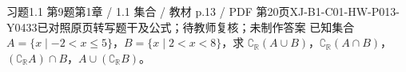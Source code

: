 \par\noindent\begin{minipage}{\linewidth}
\begin{bankitem}{习题1.1 第9题}{第1章 / 1.1 集合 / 教材 p.13 / PDF 第20页}{XJ-B1-C01-HW-P013-Y0433}{已对照原页转写题干及公式；待教师复核；未制作答案}
已知集合 $A=\{x\mid-2<x\le5\}$，$B=\{x\mid2<x<8\}$，求 $\complement_{\mathbb R}(A\cup B)$，$\complement_{\mathbb R}(A\cap B)$，$(\complement_{\mathbb R}A)\cap B$，$A\cup(\complement_{\mathbb R}B)$。
\end{bankitem}
\end{minipage}\par\medskip
